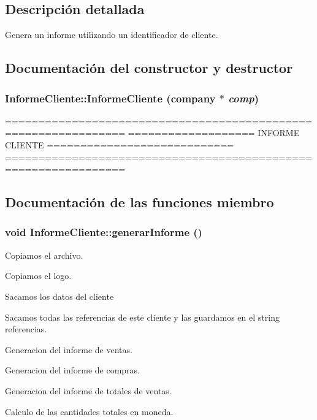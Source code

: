 \subsection{Descripci\'{o}n detallada}
Genera un informe utilizando un identificador de cliente. 



\subsection{Documentaci\'{o}n del constructor y destructor}
\subsubsection{\setlength{\rightskip}{0pt plus 5cm}Informe\-Cliente::Informe\-Cliente ({\bf company} $\ast$ {\em comp})}\label{classInformeCliente_a1}


================================================================ =================== INFORME CLIENTE ============================ ================================================================ 

\subsection{Documentaci\'{o}n de las funciones miembro}
\subsubsection{\setlength{\rightskip}{0pt plus 5cm}void Informe\-Cliente::generar\-Informe ()}\label{classInformeCliente_a0}


Copiamos el archivo.

Copiamos el logo.

Sacamos los datos del cliente

Sacamos todas las referencias de este cliente y las guardamos en el string referencias.

Generacion del informe de ventas.

Generacion del informe de compras.

Generacion del informe de totales de ventas.

Calculo de las cantidades totales en moneda.

